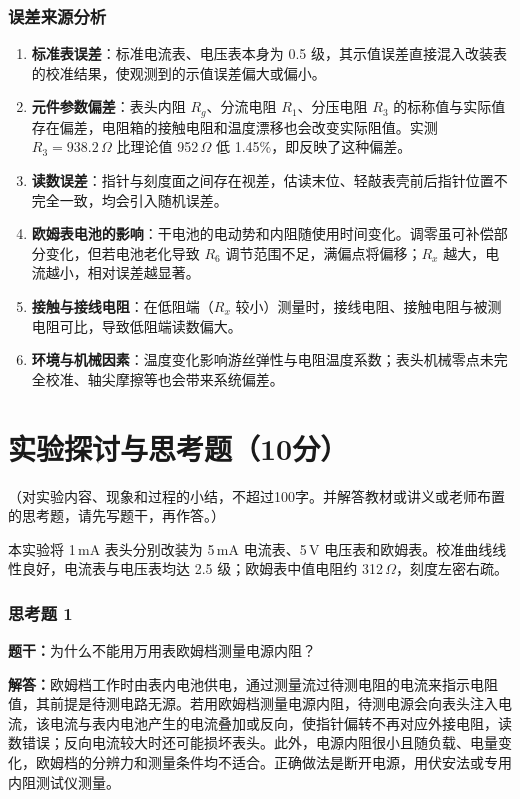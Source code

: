 \documentclass{Phyport}
\begin{document}
\subsubsection{误差来源分析}

\begin{enumerate}
    \item \textbf{标准表误差}：标准电流表、电压表本身为 0.5 级，其示值误差直接混入改装表的校准结果，使观测到的示值误差偏大或偏小。
    \item \textbf{元件参数偏差}：表头内阻 $R_g$、分流电阻 $R_1$、分压电阻 $R_3$ 的标称值与实际值存在偏差，电阻箱的接触电阻和温度漂移也会改变实际阻值。实测 $R_3=938.2\,\Omega$ 比理论值 952\,$\Omega$ 低 1.45\%，即反映了这种偏差。
    \item \textbf{读数误差}：指针与刻度面之间存在视差，估读末位、轻敲表壳前后指针位置不完全一致，均会引入随机误差。
    \item \textbf{欧姆表电池的影响}：干电池的电动势和内阻随使用时间变化。调零虽可补偿部分变化，但若电池老化导致 $R_6$ 调节范围不足，满偏点将偏移；$R_x$ 越大，电流越小，相对误差越显著。
    \item \textbf{接触与接线电阻}：在低阻端（$R_x$ 较小）测量时，接线电阻、接触电阻与被测电阻可比，导致低阻端读数偏大。
    \item \textbf{环境与机械因素}：温度变化影响游丝弹性与电阻温度系数；表头机械零点未完全校准、轴尖摩擦等也会带来系统偏差。
\end{enumerate}

\section{实验探讨与思考题（10分）}
（对实验内容、现象和过程的小结，不超过100字。并解答教材或讲义或老师布置的思考题，请先写题干，再作答。）

本实验将 1\,mA 表头分别改装为 5\,mA 电流表、5\,V 电压表和欧姆表。校准曲线线性良好，电流表与电压表均达 2.5 级；欧姆表中值电阻约 312\,$\Omega$，刻度左密右疏。

\subsubsection{思考题 1}
\textbf{题干：}为什么不能用万用表欧姆档测量电源内阻？

\textbf{解答：}欧姆档工作时由表内电池供电，通过测量流过待测电阻的电流来指示电阻值，其前提是待测电路无源。若用欧姆档测量电源内阻，待测电源会向表头注入电流，该电流与表内电池产生的电流叠加或反向，使指针偏转不再对应外接电阻，读数错误；反向电流较大时还可能损坏表头。此外，电源内阻很小且随负载、电量变化，欧姆档的分辨力和测量条件均不适合。正确做法是断开电源，用伏安法或专用内阻测试仪测量。
\end{document}
